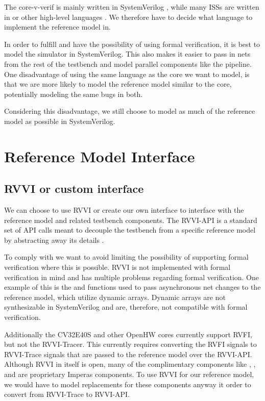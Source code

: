 The core-v-verif is mainly written in SystemVerilog \cite{openhwgroupOpenhwgroupCorevverif2023}, while many ISSs are written in \cpp or other high-level languages \cite{SpikeRISCVISA2023}.
We therefore have to decide what language to implement the reference model in.

In order to fulfill \textbf{} and have the possibility of using formal verification, it is best to model the simulator in SystemVerilog. This also makes it easier to pass in nets from the rest of the testbench and model parallel components like the pipeline. One disadvantage of using the same language as the core we want to model, is that we are more likely to model the reference model similar to the core, potentially modeling the same bugs in both. 

Considering this disadvantage, we still choose to model as much of the reference model as possible in SystemVerilog. 

\section{Reference Model Interface}
\label{sec:rmInterface}

\subsection{RVVI or custom interface}

We can choose to use RVVI or create our own interface to interface with the reference model and related testbench components. The RVVI-API is a standard set of API calls meant to decouple the testbench from a specific reference model by abstracting away its details \cite{riscv-verificationRISCVVerificationInterface2023}. 

To comply with  we want to avoid limiting the possibility of supporting formal verification where this is possible. RVVI is not implemented with formal verification in mind and has multiple problems regarding formal verification. One example of this is the  and  functions used to pass asynchronous net changes to the reference model, which utilize dynamic arrays. Dynamic arrays are not synthesizable in SystemVerilog \cite{mehtaIntroductionSystemVerilog2021} and are, therefore, not compatible with formal verification. 

Additionally the CV32E40S and other OpenHW cores currently support RVFI, but not the RVVI-Tracer. This currently requires converting the RVFI signals to RVVI-Trace signals that are passed to the reference model over the RVVI-API. 
Although RVVI in itself is open, many of the complimentary components like , , and  are proprietary Imperas components. To use RVVI for our reference model, we would have to model replacements for these components anyway it order to convert from RVVI-Trace to RVVI-API. 

